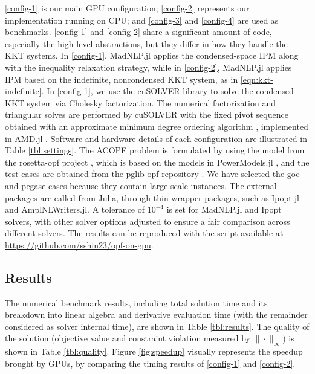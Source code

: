 \documentclass{IEEEtran4PSCC} %
\begin{document}
\ref{config-1} is our main GPU configuration; \ref{config-2}
represents our implementation running on CPU; and \ref{config-3} and
\ref{config-4} are used as benchmarks. \ref{config-1} and
\ref{config-2} share a significant amount of code, especially the
high-level abstractions, but they differ in how they handle the KKT
systems. In \ref{config-1}, MadNLP.jl applies the condensed-space IPM
along with the inequality relaxation strategy, while in
\ref{config-2}, MadNLP.jl applies IPM based on the indefinite,
noncondensed KKT system, as in \eqref{eqn:kkt-indefinite}. In
\ref{config-1}, we use the cuSOLVER library to solve the condensed KKT
system via Cholesky factorization. The numerical
factorization and triangular solves are performed by cuSOLVER with the
fixed pivot sequence obtained with an approximate minimum degree ordering algorithm \cite{amestoyApproximateMinimumDegree1996}, implemented in AMD.jl \cite{montoisonAMDJlJulia2020}.  Software and hardware details of each
configuration are illustrated in Table \ref{tbl:settings}. The ACOPF
problem is formulated by using the model from the rosetta-opf project
\cite{rosetta-opf}, which is based on the models in PowerModels.jl \cite{8442948}, and the test cases are obtained from the pglib-opf
repository \cite{babaeinejadsarookolaee2019power}. We have selected
the goc and pegase cases because they contain large-scale instances.  The
external packages are called from Julia, through thin wrapper
packages, such as Ipopt.jl and AmplNLWriters.jl. A tolerance of
$10^{-4}$ is set for MadNLP.jl and Ipopt solvers, with other solver
options adjusted to ensure a fair comparison across different
solvers. The results can be reproduced with the script available at
\url{https://github.com/sshin23/opf-on-gpu}.

\subsection{Results}

The numerical benchmark results, including total solution time and its
breakdown into linear algebra and derivative evaluation time (with the
remainder considered as solver internal time), are shown in Table
\ref{tbl:results}. The quality of the solution (objective value and
constraint violation measured by $\|\cdot\|_\infty$) is shown in Table
\ref{tbl:quality}. Figure \ref{fig:speedup} visually represents the
speedup brought by GPUs, by comparing the timing results of
\ref{config-1} and \ref{config-2}.
\end{document}
